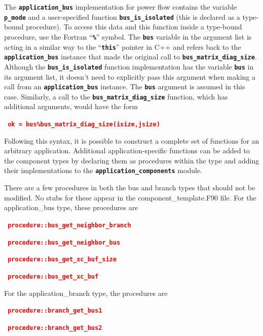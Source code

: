 \documentclass[12pt]{report} %
\begin{document}
The \texttt{\textbf{application\_bus}} implementation for power flow contains the variable \texttt{\textbf{p\_mode}} and a user-specified function \texttt{\textbf{bus\_is\_isolated}} (this is declared as a type-bound procedure). To access this data and this function inside a type-bound procedure, use the Fortran ``\texttt{\textbf{\%}}'' symbol. The \texttt{\textbf{bus}} variable in the argument list is acting in a similar way to the ``\texttt{\textbf{this}}'' pointer in C++ and refers back to the \texttt{\textbf{application\_bus}} instance that made the original call to \texttt{\textbf{bus\_matrix\_diag\_size}}. Although the \texttt{\textbf{bus\_is\_isolated}} function implementation has the variable \texttt{\textbf{bus}} in its argument list, it doesn't need to explicitly pass this argument when making a call from an \texttt{\textbf{application\_bus}} instance. The \texttt{\textbf{bus}} argument is assumed in this case. Similarly, a call to the \texttt{\textbf{bus\_matrix\_diag\_size}} function, which has additional arguments, would have the form

\textcolor{red}{\texttt{\textbf{      ok = bus\%bus\_matrix\_diag\_size(isize,jsize)}}}

Following this syntax, it is possible to construct a complete set of functions for an arbitrary application. Additional application-specific functions can be added to the component types by declaring them as procedures within the type and adding their implementations to the \texttt{\textbf{application\_components}} module.

There are a few procedures in both the bus and branch types that should not be modified. No stubs for these appear in the component\_template.F90 file. For the application\_bus type, these procedures are

\textcolor{red}{\texttt{\textbf{    procedure::bus\_get\_neighbor\_branch}}}

\textcolor{red}{\texttt{\textbf{    procedure::bus\_get\_neighbor\_bus}}}

\textcolor{red}{\texttt{\textbf{    procedure::bus\_get\_xc\_buf\_size}}}

\textcolor{red}{\texttt{\textbf{    procedure::bus\_get\_xc\_buf}}}

For the application\_branch type, the procedures are

\textcolor{red}{\texttt{\textbf{    procedure::branch\_get\_bus1}}}

\textcolor{red}{\texttt{\textbf{    procedure::branch\_get\_bus2}}}
\end{document}

